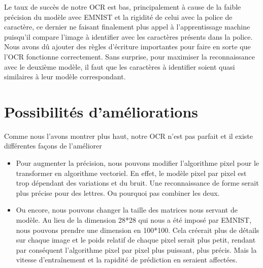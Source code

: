 \documentclass[a4paper, 12pt]{article}
\begin{document}
Le taux de succès de notre OCR est bas, principalement à cause de la faible précision du modèle avec EMNIST et la rigidité de celui avec la police de caractère, ce dernier ne faisant finalement plus appel à l'apprentissage machine puisqu'il compare l'image à identifier avec les caractères présents dans la police. Nous avons dû ajouter des règles d'écriture importantes pour faire en sorte que l'OCR fonctionne correctement. Sans surprise, pour maximiser la reconnaissance avec le deuxième modèle, il faut que les caractères à identifier soient quasi similaires à leur modèle correspondant.

\section{Possibilités d'améliorations}
Comme nous l'avons montrer plus haut, notre OCR n'est pas parfait et il existe différentes façons de l'améliorer
\begin{itemize}
\item Pour augmenter la précision, nous pouvons modifier l'algorithme pixel pour le transformer en algorithme vectoriel. En effet, le modèle pixel par pixel est trop dépendant des variations et du bruit. Une reconnaissance de forme serait plus précise pour des lettres. Ou pourquoi pas combiner les deux.

\item Ou encore, nous pouvons changer la taille des matrices nous servant de modèle. Au lieu de la dimension 28*28 qui nous a été imposé par EMNIST, nous pouvons prendre une dimension en 100*100. Cela créerait plus de détails sur chaque image et le poids relatif de chaque pixel serait plus petit, rendant par conséquent l'algorithme pixel par pixel plus puissant, plus précis. Mais la  vitesse d'entraînement et la rapidité de prédiction en seraient affectées.
\end{itemize}
\end{document}
